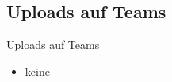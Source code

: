 \subsection{Uploads auf Teams}
\begin{frame}{Uploads auf Teams}
	\begin{itemize}
		\item[\textbullet] keine
	\end{itemize}
	        
\end{frame}

        

\folieFragen

